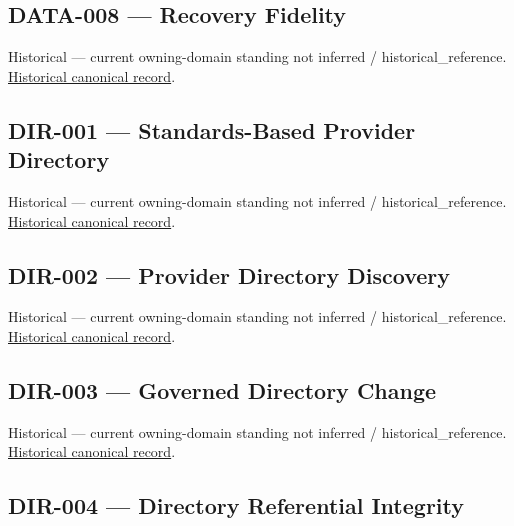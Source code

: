 \subsection{DATA-008 — Recovery Fidelity}

\par\label{element:7c7a33be31d042459adb83c71ae044fa}
Historical — current owning-domain standing not inferred / historical\_reference. \href{../../../../continuum/motivation/requirement/7c7a33be31d042459adb83c71ae044fa.md}{Historical canonical record}.\par

\subsection{DIR-001 — Standards-Based Provider Directory}

\par\label{element:c1b1d82f8a9b4c649a3216c5e09a22c6}
Historical — current owning-domain standing not inferred / historical\_reference. \href{../../../../continuum/motivation/requirement/c1b1d82f8a9b4c649a3216c5e09a22c6.md}{Historical canonical record}.\par

\subsection{DIR-002 — Provider Directory Discovery}

\par\label{element:27998c2a8f2e497a814b32e7a0bc5e03}
Historical — current owning-domain standing not inferred / historical\_reference. \href{../../../../continuum/motivation/requirement/27998c2a8f2e497a814b32e7a0bc5e03.md}{Historical canonical record}.\par

\subsection{DIR-003 — Governed Directory Change}

\par\label{element:934462c11133409cb3aa59bf2502fa81}
Historical — current owning-domain standing not inferred / historical\_reference. \href{../../../../continuum/motivation/requirement/934462c11133409cb3aa59bf2502fa81.md}{Historical canonical record}.\par

\subsection{DIR-004 — Directory Referential Integrity}

